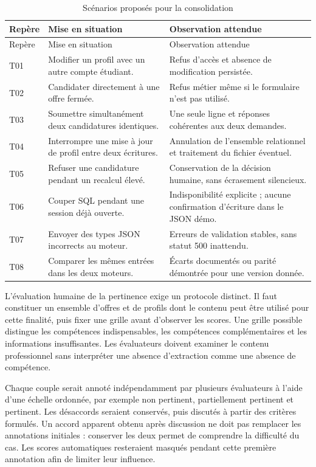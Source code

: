\begingroup
\small
\begin{longtable}{@{}P{0.13\textwidth}P{0.34\textwidth}P{0.45\textwidth}@{}}
\caption{Scénarios proposés pour la consolidation}\label{tab:ann-tests-proposes}\\
\toprule
Repère & Mise en situation & Observation attendue \\
\midrule
\endfirsthead
\toprule
Repère & Mise en situation & Observation attendue \\
\midrule
\endhead
T01 & Modifier un profil avec un autre compte étudiant. & Refus d'accès et absence de modification persistée. \\
T02 & Candidater directement à une offre fermée. & Refus métier même si le formulaire n'est pas utilisé. \\
T03 & Soumettre simultanément deux candidatures identiques. & Une seule ligne et réponses cohérentes aux deux demandes. \\
T04 & Interrompre une mise à jour de profil entre deux écritures. & Annulation de l'ensemble relationnel et traitement du fichier éventuel. \\
T05 & Refuser une candidature pendant un recalcul élevé. & Conservation de la décision humaine, sans écrasement silencieux. \\
T06 & Couper SQL pendant une session déjà ouverte. & Indisponibilité explicite ; aucune confirmation d'écriture dans le JSON démo. \\
T07 & Envoyer des types JSON incorrects au moteur. & Erreurs de validation stables, sans statut 500 inattendu. \\
T08 & Comparer les mêmes entrées dans les deux moteurs. & Écarts documentés ou parité démontrée pour une version donnée. \\
\bottomrule
\end{longtable}
\endgroup

L'évaluation humaine de la pertinence exige un protocole distinct. Il faut constituer un ensemble d'offres et de profils dont le contenu peut être utilisé pour cette finalité, puis fixer une grille avant d'observer les scores. Une grille possible distingue les compétences indispensables, les compétences complémentaires et les informations insuffisantes. Les évaluateurs doivent examiner le contenu professionnel sans interpréter une absence d'extraction comme une absence de compétence.

Chaque couple serait annoté indépendamment par plusieurs évaluateurs à l'aide d'une échelle ordonnée, par exemple non pertinent, partiellement pertinent et pertinent. Les désaccords seraient conservés, puis discutés à partir des critères formulés. Un accord apparent obtenu après discussion ne doit pas remplacer les annotations initiales : conserver les deux permet de comprendre la difficulté du cas. Les scores automatiques resteraient masqués pendant cette première annotation afin de limiter leur influence.

